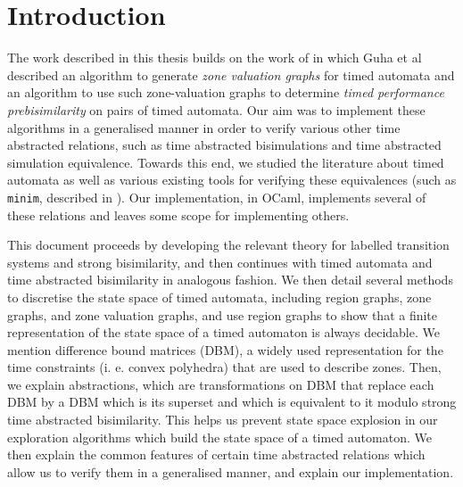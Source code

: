 \chapter{Introduction}

The work described in this thesis builds on the work of
\cite{DBLP:conf/cav/GuhaNA12} in which Guha et al described an
algorithm to generate \emph{zone valuation graphs} for timed automata
and an algorithm to use such zone-valuation graphs to determine
\emph{timed performance prebisimilarity} on pairs of timed
automata. Our aim was to implement these algorithms in a generalised
manner in order to verify various other time abstracted relations,
such as time abstracted bisimulations \cite{tripakis2001analysis} and
time abstracted simulation equivalence. Towards
this end, we studied the literature about timed automata as well as
various existing tools for verifying these
equivalences (such as \texttt{minim}, described in
\cite{tripakis2001analysis}). Our implementation, in OCaml, implements
several of these relations and leaves some scope for implementing
others.

This document proceeds by developing the relevant theory for labelled transition
systems and strong bisimilarity, and then continues with timed
automata and time abstracted bisimilarity in analogous fashion. We 
then detail several methods to discretise the state space of timed
automata, including region graphs, zone graphs, and zone valuation
graphs, and use region graphs to show that a finite representation of
the state space of a timed automaton is always decidable. We mention
difference bound matrices (DBM), a widely used representation for the time
constraints (i. e. convex polyhedra) that are used to describe
zones. Then, we explain abstractions, which are transformations on DBM
that replace each DBM by a DBM which is its superset and
which is equivalent to it modulo strong time abstracted
bisimilarity. This helps us prevent state space explosion in our
exploration algorithms which build the state space of a timed
automaton. We then explain the common features of certain time
abstracted relations which allow us to verify them in a generalised
manner, and explain our implementation.
